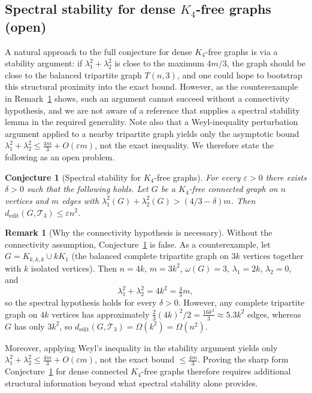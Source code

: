 \documentclass[preprint,12pt]{elsarticle}
\theoremstyle{plain}
\newtheorem{conjecture}[theorem]{Conjecture}
\theoremstyle{definition}
\newtheorem{remark}[theorem]{Remark}
\newcommand{\dedit}{d_{\mathrm{edit}}}
\begin{document}
\subsection{Spectral stability for dense $K_4$-free graphs (open)}
\label{ssec:stability}

A natural approach to the full conjecture for dense $K_4$-free graphs is
via a stability argument: if $\lambda_1^2 + \lambda_2^2$ is close to the
maximum $4m/3$, the graph should be close to the balanced tripartite graph
$T(n,3)$, and one could hope to bootstrap this structural proximity into the
exact bound.
However, as the counterexample in Remark~\ref{rem:stability-gap} shows,
such an argument cannot succeed without a connectivity hypothesis,
and we are not aware of a reference that supplies a spectral stability lemma
in the required generality.
Note also that a Weyl-inequality perturbation argument applied to a nearby
tripartite graph yields only the asymptotic bound
$\lambda_1^2 + \lambda_2^2 \leq \tfrac{4m}{3} + O(\varepsilon m)$,
not the exact inequality.
We therefore state the following as an open problem.

\begin{conjecture}[Spectral stability for $K_4$-free graphs]
  \label{conj:stability}
  For every $\varepsilon > 0$ there exists $\delta > 0$ such that
  the following holds.
  Let $G$ be a $K_4$-free \emph{connected} graph on $n$ vertices and
  $m$ edges with
  $\lambda_1^2(G) + \lambda_2^2(G) > (4/3 - \delta)m$.
  Then $\dedit(G, \mathcal{T}_3) \leq \varepsilon n^2$.
\end{conjecture}

\begin{remark}[Why the connectivity hypothesis is necessary]
  \label{rem:stability-gap}
  Without the connectivity assumption, Conjecture~\ref{conj:stability}
  is false.
  As a counterexample, let $G = K_{k,k,k} \cup kK_1$ (the balanced
  complete tripartite graph on $3k$ vertices together with $k$ isolated
  vertices).
  Then $n = 4k$, $m = 3k^2$, $\omega(G) = 3$, $\lambda_1 = 2k$,
  $\lambda_2 = 0$, and
  \[
    \lambda_1^2 + \lambda_2^2 = 4k^2 = \tfrac{4}{3}m,
  \]
  so the spectral hypothesis holds for every $\delta > 0$.
  However, any complete tripartite graph on $4k$ vertices has approximately
  $\tfrac{2}{3}(4k)^2/2 = \tfrac{16k^2}{3} \approx 5.3k^2$ edges, whereas
  $G$ has only $3k^2$, so $\dedit(G, \mathcal{T}_3) = \Omega(k^2) = \Omega(n^2)$.

  Moreover, applying Weyl's inequality in the stability argument yields
  only $\lambda_1^2 + \lambda_2^2 \leq \tfrac{4m}{3} + O(\varepsilon m)$,
  not the exact bound $\leq \tfrac{4m}{3}$.
  Proving the sharp form Conjecture~\ref{conj:stability} for dense
  connected $K_4$-free graphs therefore requires additional structural
  information beyond what spectral stability alone provides.
\end{remark}
\end{document}
